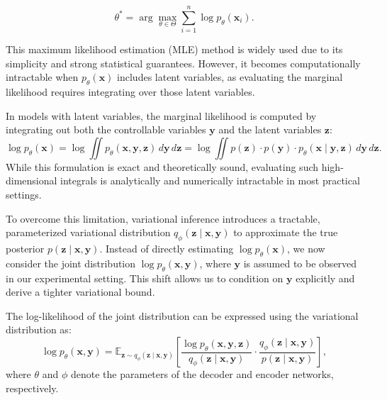 \documentclass{article}
\begin{document}
{\begin{equation}
\theta^* = \arg\max_{\theta \in \Theta} \sum_{i=1}^{n} \log p_\theta(\mathbf{x}_i).
\end{equation}

This maximum likelihood estimation (MLE) method is widely used due to its simplicity and strong statistical guarantees. However, it becomes computationally intractable when $p_\theta(\mathbf{x})$ includes latent variables, as evaluating the marginal likelihood requires integrating over those latent variables.

In models with latent variables, the marginal likelihood is computed by integrating out both the controllable variables $\mathbf{y}$ and the latent variables $\mathbf{z}$:
\begin{equation}
\log p_\theta(\mathbf{x}) = \log \iint p_\theta(\mathbf{x}, \mathbf{y}, \mathbf{z}) \, d\mathbf{y} \, d\mathbf{z} = \log \iint p(\mathbf{z}) \cdot p(\mathbf{y}) \cdot p_\theta(\mathbf{x} \mid \mathbf{y}, \mathbf{z}) \, d\mathbf{y} \, d\mathbf{z}.
\end{equation}
While this formulation is exact and theoretically sound, evaluating such high-dimensional integrals is analytically and numerically intractable in most practical settings.

To overcome this limitation, variational inference \cite{blei_variational_2017, kingma2014semi} introduces a tractable, parameterized variational distribution $q_\phi(\mathbf{z} \mid \mathbf{x}, \mathbf{y})$ to approximate the true posterior $p(\mathbf{z} \mid \mathbf{x}, \mathbf{y})$. Instead of directly estimating $\log p_\theta(\mathbf{x})$, we now consider the joint distribution $\log p_\theta(\mathbf{x}, \mathbf{y})$, where $\mathbf{y}$ is assumed to be observed in our experimental setting. This shift allows us to condition on $\mathbf{y}$ explicitly and derive a tighter variational bound.

The log-likelihood of the joint distribution can be expressed using the variational distribution as:
\begin{equation}\label{eq:pxy}
\log p_\theta(\mathbf{x}, \mathbf{y}) = \mathbb{E}_{\mathbf{z} \sim q_{\phi}(\mathbf{z} \mid \mathbf{x}, \mathbf{y})} \left[ 
\frac{\log p_\theta(\mathbf{x}, \mathbf{y}, \mathbf{z})}{q_{\phi}(\mathbf{z} \mid \mathbf{x}, \mathbf{y})} 
\cdot 
\frac{q_{\phi}(\mathbf{z} \mid \mathbf{x}, \mathbf{y})}{p(\mathbf{z} \mid \mathbf{x}, \mathbf{y})}
\right],
\end{equation}
where $\theta$ and $\phi$ denote the parameters of the decoder and encoder networks, respectively.

}
\end{document}
